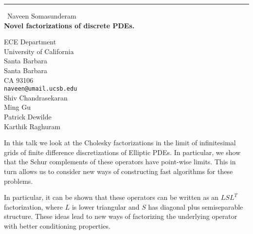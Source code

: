 \documentclass{report}
\begin{document}
\begin{center}
\rule{6in}{1pt} \
{\large Naveen Somasunderam \\
{\bf Novel factorizations of discrete PDEs. }}

ECE Department \\ University of California \\ Santa Barbara \\ Santa Barbara \\ CA 93106
\\
{\tt naveen@umail.ucsb.edu}\\
Shiv Chandrasekaran\\
Ming Gu\\
Patrick Dewilde\\
Karthik Raghuram\end{center}

In this talk we look at the Cholesky factorizations in the limit of
infinitesimal grids of finite difference discretizations
of Elliptic PDEs. In particular, we show that the Schur complements of
these operators have point-wise limits. This in turn allows us to
consider new ways of constructing fast algorithms for these problems.

In particular, it can be shown that these operators can be written as an
$L SL^{T}$ factorization, where $L$ is lower triangular and $S$ has
diagonal plus semiseparable structure. These ideas lead to new ways of
factorizing the underlying operator with better conditioning properties.
\end{document}
